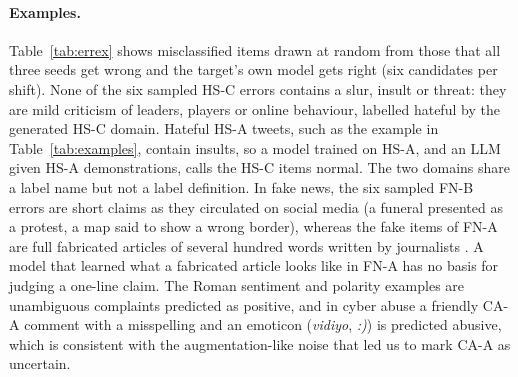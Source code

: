 \documentclass[acmsmall,screen]{acmart}
\begin{document}
\paragraph{Examples.} Table~\ref{tab:errex} shows misclassified items drawn at random from those that all three seeds get wrong and the target's own model gets right (six candidates per shift). None of the six sampled HS-C errors contains a slur, insult or threat: they are mild criticism of leaders, players or online behaviour, labelled hateful by the generated HS-C domain. Hateful HS-A tweets, such as the example in Table~\ref{tab:examples}, contain insults, so a model trained on HS-A, and an LLM given HS-A demonstrations, calls the HS-C items normal. The two domains share a label name but not a label definition. In fake news, the six sampled FN-B errors are short claims as they circulated on social media (a funeral presented as a protest, a map said to show a wrong border), whereas the fake items of FN-A are full fabricated articles of several hundred words written by journalists \citep{amjad2020bend}. A model that learned what a fabricated article looks like in FN-A has no basis for judging a one-line claim. The Roman sentiment and polarity examples are unambiguous complaints predicted as positive, and in cyber abuse a friendly CA-A comment with a misspelling and an emoticon (\textit{vidiyo}, \textit{:)}) is predicted abusive, which is consistent with the augmentation-like noise that led us to mark CA-A as uncertain.
\end{document}
